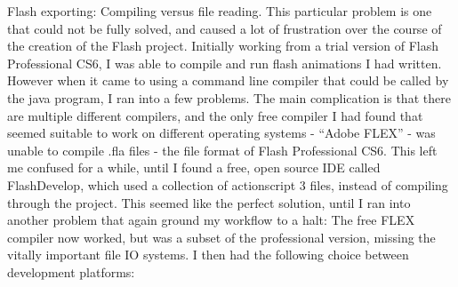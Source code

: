 \documentclass{l3proj}
\begin{document}
Flash exporting: Compiling versus file reading.
	This particular problem is one that could not be fully solved, and caused a lot of frustration over the course of the creation of the Flash project. Initially working from a trial version of Flash Professional CS6, I was able to compile and run flash animations I had written. However when it came to using a command line compiler that could be called by the java program, I ran into a few problems. The main complication is that there are multiple different compilers, and the only free compiler I had found that seemed suitable to work on different operating systems - “Adobe FLEX” - was unable to compile .fla files - the file format of Flash Professional CS6. This left me confused for a while, until I found a free, open source IDE called FlashDevelop, which used a collection of actionscript 3 files, instead of compiling through the project. This seemed like the perfect solution, until I ran into another problem that again ground my workflow to a halt: The free FLEX compiler now worked, but was a subset of the professional version, missing the vitally important file IO systems. I then had the following choice between development platforms:
\end{document}
